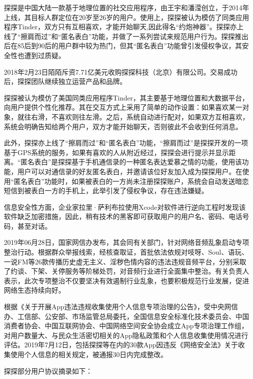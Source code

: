 \documentclass[UTF8]{ctexart}
\begin{document}
探探是中国大陆一款基于地理位置的社交应用程序，由王宇和潘滢创立，于2014年上线，其目标人群定位在20岁至26岁的用户。使用上，探探被认为模仿了同类应用程序Tinder，双方只有互相喜欢，才能开始聊天,因此得名“约炮神器”。探探亦上线了“擦肩而过”和“匿名表白”功能，并做了一系列尝试来规范用户行为。探探推出后在85后到90后的用户群中较为热门，但其“匿名表白”功能曾引发侵权争议，其安全性也遭到过质疑。

2018年2月23日陌陌斥资7.71亿美元收购探探科技（北京）有限公司。交易成功后，探探团队继续独立运营产品和品牌。\cite{MoMoHistory}

探探被认为模仿了美国同类应用程序Tinder，其主要基于地理位置和大数据平台，向用户提供个性化推荐。其在交互方式上采用了简单的动作设置：如果喜欢某一对象，就往右滑，不喜欢则往左滑。之后，系统自动进行配对，如果双方互相喜欢，系统会明确告知给两个用户，双方才能开始聊天，否则彼此不会收到任何消息。

此外，探探亦上线了“擦肩而过”和“匿名表白”功能，“擦肩而过”是探探开发的一项基于GPS系统的服务，如果有喜欢的人从附近经过，探探会进行提示并显示距离。“匿名表白”是探探基于手机通信录的一种匿名表达爱慕之情的功能，使用该功能，用户可以对通信录的好友匿名表白，并邀请该位好友加入成为探探用户。在使用“匿名表白”功能时，如果被表白的一方尚未注册探探账户，系统会自动发送暗恋短信到被表白一方的手机上，此举引发了侵权争议，存在违法嫌疑。

信息安全性方面，企业家拉里·萨利布拉使用Xcode对软件进行逆向工程时发现该软件缺乏加密措施，因此，稍有技术的黑客即可获取用户的用户名、密码、电话号码，甚至对话。

2019年06月28日，国家网信办发布，其会同有关部门，针对网络音频乱象启动专项整治行动。根据群众举报线索，经核查取证，首批依法依规对吱呀、Soul、语玩、一说FM等26款传播历史虚无主义、淫秽色情内容的违法违规音频平台，分别采取了约谈、下架、关停服务等阶梯处罚，对音频行业进行全面集中整治。有关负责人表示，此次专项整治不仅要坚决有效遏制行业乱象，也要积极规范行业发展，促进网络生态持续向好。\cite{Audio}

根据《关于开展App违法违规收集使用个人信息专项治理的公告》，受中央网信办、工信部、公安部、市场监管总局委托，全国信息安全标准化技术委员会、中国消费者协会、中国互联网协会、中国网络空间安全协会成立App专项治理工作组，对用户数量大、与民众生活密切相关的App隐私政策和个人信息收集使用情况进行评估。2019年7月12日，包括探探等在内的30款App因违反《网络安全法》关于收集使用个人信息的相关规定，被通报30日内完成整改。\cite{Privacy}

探探部分用户协议摘录如下：
\end{document}
